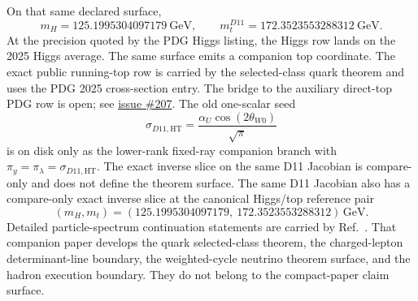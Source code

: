 \documentclass[11pt]{article}
\begin{document}
On that same declared surface,
\[
m_H=125.1995304097179~\mathrm{GeV},
\qquad
m_t^{D11}=172.3523553288312~\mathrm{GeV}.
\]
At the precision quoted by the PDG Higgs listing, the Higgs row lands on the 2025 Higgs average. The
same surface emits a companion top coordinate. The exact public running-top row is carried by the
selected-class quark theorem and uses the PDG 2025 cross-section entry. The bridge to the auxiliary
direct-top PDG row is open; see \href{https://github.com/FloatingPragma/observer-patch-holography/issues/207}{issue \#207}.
The old one-scalar seed
\[
\sigma_{D11,\mathrm{HT}}=\frac{\alpha_U\cos(2\theta_{W0})}{\sqrt{\pi}}
\]
is on disk only as the lower-rank fixed-ray companion branch with \(\pi_y=\pi_\lambda=\sigma_{D11,\mathrm{HT}}\). The exact inverse slice on the same D11 Jacobian is compare-only and does not define the theorem surface.
The same D11 Jacobian also has a compare-only exact inverse slice at the canonical Higgs/top reference pair
\[
(m_H,m_t)=
(125.1995304097179,\ 172.3523553288312)\,\mathrm{GeV}.
\]
Detailed particle-spectrum continuation statements are carried by Ref.~\cite{ophparticles}. That companion paper develops the quark selected-class theorem, the charged-lepton determinant-line boundary, the weighted-cycle neutrino theorem surface, and the hadron execution boundary. They do not belong to the compact-paper claim surface.
\end{document}
